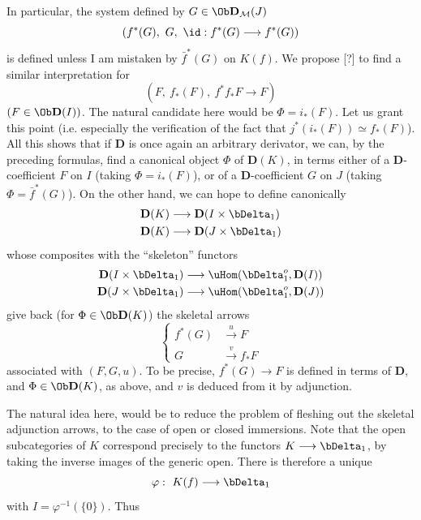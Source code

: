 In particular, the system defined by $G \in \Ob \mathbf{D}_{\mathcal{M}}(J)$
\[ (f^*(G),\ G,\ \id : f^*(G) \longrightarrow f^*(G)) \]
is defined unless I am mistaken by $\bar{f}^*(G)$ on $K(f)$. We propose [?] to find a similar interpretation for
\[ (F,\ f_*(F),\ f^*f_*F \longrightarrow F) \]
$(F \in \Ob \mathbf{D}(I))$. The natural candidate here would be $\Phi = i_*(F)$. Let us grant this point (i.e. especially the verification of the fact that $j^*(i_*(F)) \simeq f_*(F)$). All this shows that if $\mathbf{D}$ is once again an arbitrary derivator, we can, by the preceding formulas, find a canonical object $\Phi$ of $\mathbf{D}(K)$, in terms either of a $\mathbf{D}$-coefficient $F$ on $I$ (taking $\Phi = i_*(F)$), or of a $\mathbf{D}$-coefficient $G$ on $J$ (taking $\Phi = \bar{f}^*(G)$). On the other hand, we can hope to define canonically
\[
\begin{aligned}
\mathbf{D}(K) &\longrightarrow \mathbf{D}(I \times \bDelta_1)\\
\mathbf{D}(K) &\longrightarrow \mathbf{D}(J \times \bDelta_1)
\end{aligned}
\]
whose composites with the ``skeleton'' functors
\[
\begin{aligned}
\mathbf{D}(I \times \bDelta_1) &\longrightarrow \uHom(\bDelta_1^o, \mathbf{D}(I))\\
\mathbf{D}(J \times \bDelta_1) &\longrightarrow \uHom(\bDelta_1^o, \mathbf{D}(J))
\end{aligned}
\]
give back (for $\Phi \in \Ob \mathbf{D}(K)$) the skeletal arrows
\[
\left\{
\begin{aligned}
f^*(G) &\xrightarrow{\ u\ } F\\
G &\xrightarrow{\ v\ } f_*F
\end{aligned}
\right.
\]
associated with $(F,G,u)$. To be precise, $f^*(G) \longrightarrow F$ is defined in terms of $\mathbf{D}$, and $\Phi \in \Ob \mathbf{D}(K)$, as above, and $v$ is deduced from it by adjunction.

The natural idea here, would be to reduce the problem of fleshing out the skeletal adjunction arrows, to the case of open or closed immersions. Note that the open subcategories of $K$ correspond precisely to the functors $K \longrightarrow \bDelta_1$, by taking the inverse images of the generic open. There is therefore a unique %
\[ \varphi :\ K(f) \longrightarrow \bDelta_1 \]
with $I = \varphi^{-1}(\{0\})$. Thus